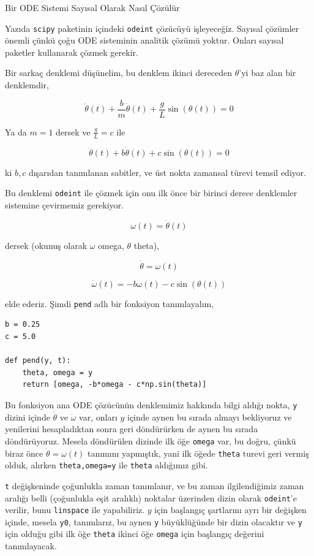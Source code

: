 \documentclass[12pt,fleqn]{article}\usepackage{../../common}
\begin{document}
Bir ODE Sistemi Sayısal Olarak Nasıl Çözülür

Yazıda \verb!scipy! paketinin içindeki \verb!odeint! çözücüyü işleyeceğiz.
Sayısal çözümler önemli çünkü çoğu ODE sisteminin analitik çözümü
yoktur. Onları sayısal paketler kullanarak çözmek gerekir. 

Bir sarkaç denklemi düşünelim, bu denklem ikinci dereceden $\theta$'yi baz
alan bir denklemdir,

$$
\ddot{\theta}(t) + \frac{b}{m} \dot{\theta}(t) +  \frac{g}{L} \sin(\theta(t)) = 0
$$

Ya da $m = 1$ dersek ve $\frac{g}{L} = c$ ile

$$
\ddot{\theta}(t) + b \dot{\theta}(t) +  c \sin(\theta(t)) = 0
$$

ki $b,c$ dışarıdan tanımlanan sabitler, ve üst nokta zamansal türevi temsil
ediyor. 

Bu denklemi \verb!odeint! ile çözmek için onu ilk önce bir birinci derece
denklemler sistemine çevirmemiz gerekiyor.

$$
\omega(t) = \dot{\theta}(t)
$$

dersek (okunuş olarak $\omega$ omega, $\theta$ theta),

$$
\dot{\theta} = \omega(t)
$$

$$
\dot{\omega}(t) = -b \omega(t) - c\sin(\theta(t))
$$

elde ederiz. Şimdi \verb!pend! adlı bir fonksiyon tanımlayalım,

\begin{verbatim}
b = 0.25
c = 5.0

def pend(y, t):
    theta, omega = y
    return [omega, -b*omega - c*np.sin(theta)]
\end{verbatim}

Bu fonksiyon ana ODE çözücünün denklemimiz hakkında bilgi aldığı nokta,
\verb!y! dizini içinde $\dot{\theta}$ ve $\dot{\omega}$ var, onları $y$
içinde aynen bu sırada almayı bekliyoruz ve yenilerini hesapladıktan sonra
geri döndürürken de aynen bu sırada döndürüyoruz. Mesela döndürülen dizinde
ilk öğe \verb!omega! var, bu doğru, çünkü biraz önce
$\dot{\theta} = \omega(t)$ tanımını yapmıştık, yani ilk öğede \verb!theta!
turevi geri vermiş olduk, alırken \verb!theta,omega=y! ile \verb!theta!
aldığımız gibi.

\verb!t! değişkeninde çoğunlukla zaman tanımlanır, ve bu zaman
ilgilendiğimiz zaman aralığı belli (çoğunlukla eşit aralıklı) noktalar
üzerinden dizin olarak \verb!odeint!'e verilir, bunu \verb!linspace! ile
yapabiliriz. $y$ için başlangıç şartlarını ayrı bir değişken içinde, mesela
\verb!y0!, tanımlarız, bu aynen \verb!y! büyüklüğünde bir dizin olacaktır
ve \verb!y!  için olduğu gibi ilk öğe \verb!theta! ikinci öğe \verb!omega!
için başlangıç değerini tanımlayacak.
\end{document}

